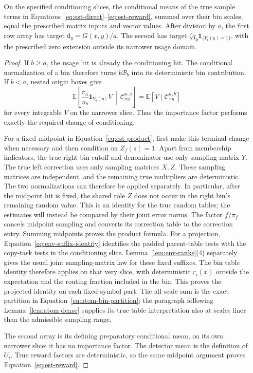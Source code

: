 \begin{lemma}\label{lem:est-true-means}
On the specified conditioning slices, the conditional means of the true
sample terms in Equations~\eqref{eq:est-direct}--\eqref{eq:est-reward},
summed over their bin scales, equal the prescribed matrix inputs and
vector values. After division by $a$, the first row array has target
$\mathsf{d}_y=G(x,y)/a$. The second has target
$\zeta q_y\mathbf1_{\{Y_t(y)=1\}}$, with the prescribed zero extension
outside its narrower usage domain.
\end{lemma}
\begin{proof}
If $b\ge a$, the usage hit is already the conditioning hit.  The
conditional normalization of a bin therefore turns $b\mathcal B_b$ into
its deterministic bin contribution.  If $b<a$, nested origin boxes give
\[
 \mathbb E\left[\frac{\pi_a}{\pi_b}\mathbf1_{Y_b(y)}V
                   \,\middle|\,\mathcal C_{xy}^{u,a}\right]
   =\mathbb E[V\mid\mathcal C_{xy}^{u,b}]
\]
for every integrable $V$ on the narrower slice.  Thus the importance factor
performs exactly the required change of conditioning.

For a fixed midpoint in Equation~\eqref{eq:est-product}, first make this
terminal change when necessary and then condition on $Z_f(z)=1$.
Apart from membership indicators, the true right bin cutoff and denominator
use only sampling matrix $Y$.  The true left correction uses only sampling matrices $X,Z$.
These sampling matrices are independent, and the remaining true multipliers are
deterministic.  The two normalizations can therefore be applied separately.
In particular, after the midpoint hit is fixed, the shared role $Z$
does not occur in the right bin's remaining random value.  This is an
identity for the true random tables; the estimates will instead be compared by
their joint error norms.
The factor $f/\pi_f$ cancels midpoint sampling and converts its correction
table to the correction entry.  Summing midpoints proves the product
formula.  For a projection, Equation~\eqref{eq:env-suffix-identity}
identifies the padded parent-table tests with the copy-task tests in
the conditioning slice.  Lemma~\ref{lem:env-ranks}(4) separately gives
the usual joint sampling-matrix law for these fixed suffixes.  The bin table
identity therefore applies on that very slice, with deterministic
$r_i(x)$ outside the expectation and the routing fraction included in
the bin.  This proves the projected identity on each fixed-symbol part.
The all-scale sum is the exact partition in
Equation~\eqref{eq:atom-bin-partition}; the paragraph following
Lemma~\ref{lem:atom-dense} supplies its true-table interpretation also
at scales finer than the admissible sampling range.

The second array is its defining preparatory conditional mean, on its
own narrower slice; it has no importance factor.  The detector mean is
the definition of $U_i$.  True reward factors are deterministic, so the
same midpoint argument proves Equation~\eqref{eq:est-reward}.
\end{proof}


